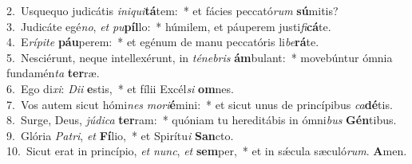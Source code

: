 {2.~}Usquequo judicátis \textit{i}\textit{ni}\textit{qui}\textbf{tá}tem:~* et fácies peccató\textit{rum} \textbf{sú}mitis?\\
{3.~}Judicáte egé\textit{no}, \textit{et} \textit{pu}\textbf{píl}lo:~* húmilem, et páuperem justi\textit{fi}\textbf{cá}te.\\
{4.~}E\textit{rí}\textit{pi}\textit{te} \textbf{páu}perem:~* et egénum de manu peccatóris li\textit{be}\textbf{rá}te.\\
{5.~}Nesciérunt, neque intellexérunt, in \textit{té}\textit{ne}\textit{bris} \textbf{ám}bulant:~* movebúntur ómnia fundamén\textit{ta} \textbf{ter}ræ.\\
{6.~}Ego di\textit{xi}: \textit{Di}\textit{i} \textbf{e}stis,~* et fílii Excél\textit{si} \textbf{om}nes.\\
{7.~}Vos autem sicut hómi\textit{nes} \textit{mo}\textit{ri}\textbf{é}mini:~* et sicut unus de princípibus \textit{ca}\textbf{dé}tis.\\
{8.~}Surge, Deus, \textit{jú}\textit{di}\textit{ca} \textbf{ter}ram:~* quóniam tu hereditábis in ómni\textit{bus} \textbf{Gén}tibus.\\
{9.~}Glória \textit{Pa}\textit{tri}, \textit{et} \textbf{Fí}lio,~* et Spirítu\textit{i} \textbf{San}cto.\\
{10.~}Sicut erat in princípio, \textit{et} \textit{nunc}, \textit{et} \textbf{sem}per,~* et in sǽcula sæculó\textit{rum}. \textbf{A}men.\\

